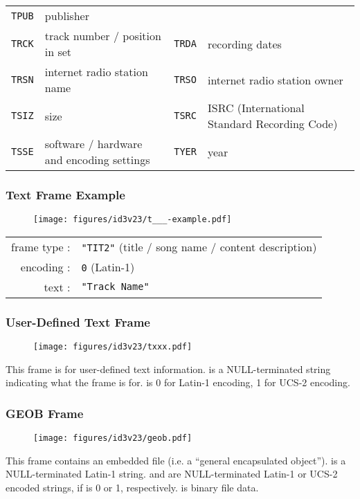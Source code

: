 \begin{table}[h]
{\begin{tabular}{|c|l||c|l|}
      \texttt{TPUB} & publisher \\
      \texttt{TRCK} & track number / position in set &
      \texttt{TRDA} & recording dates \\
      \texttt{TRSN} & internet radio station name &
      \texttt{TRSO} & internet radio station owner \\
      \texttt{TSIZ} & size &
      \texttt{TSRC} & ISRC (International Standard Recording Code) \\
      \texttt{TSSE} & software / hardware and encoding settings &
      \texttt{TYER} & year \\
      \hline
    \end{tabular}
  }
\end{table}

\subsubsection{Text Frame Example}
\begin{figure}[h]
  \texttt{[image: figures/id3v23/t\_\_\_-example.pdf]}
\end{figure}
\par
\noindent
\begin{tabular}{rl}
frame type : & \texttt{"TIT2"} (title / song name / content description) \\
encoding : & \texttt{0} (Latin-1) \\
text : & \texttt{"Track Name"} \\
\end{tabular}

\clearpage

\subsubsection{User-Defined Text Frame}

\begin{figure}[h]
  \texttt{[image: figures/id3v23/txxx.pdf]}
\end{figure}
\par
\noindent
This frame is for user-defined text information.
 is a NULL-terminated string indicating
what the frame is for.
 is 0 for Latin-1 encoding, 1 for UCS-2 encoding.

\subsubsection{GEOB Frame}
\begin{figure}[h]
\texttt{[image: figures/id3v23/geob.pdf]}
\end{figure}
This frame contains an embedded file (i.e. a ``general encapsulated object'').
 is a NULL-terminated Latin-1 string.
 and  are NULL-terminated
Latin-1 or UCS-2 encoded strings, if  is 0 or 1,
respectively.
 is binary file data.

